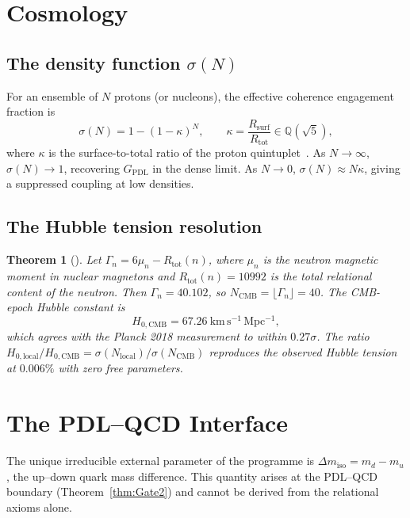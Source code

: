 \documentclass[11pt,a4paper]{article}
\theoremstyle{plain}
\newtheorem{theorem}{Theorem}[section]
\theoremstyle{definition}
\theoremstyle{remark}
\newcommand{\GPDL}{G_{\mathrm{PDL}}}
\newcommand{\Rsurf}{R_{\mathrm{surf}}}
\newcommand{\Rtot}{R_{\mathrm{tot}}}
\begin{document}
\section{Cosmology}
\label{sec:cosmology}

\subsection{The density function \texorpdfstring{$\sigma(N)$}{sigma(N)}}
\label{subsec:sigma}

For an ensemble of $N$ protons (or nucleons), the effective coherence engagement fraction is
\[
\sigma(N) = 1 - (1-\kappa)^N, \qquad \kappa = \frac{\Rsurf}{\Rtot} \in \mathbb{Q}(\sqrt{5}),
\]
where $\kappa$ is the surface-to-total ratio of the proton quintuplet~\citep{D24,D26}.
As $N\to\infty$, $\sigma(N)\to 1$, recovering $\GPDL$ in the dense limit.
As $N\to 0$, $\sigma(N)\approx N\kappa$, giving a suppressed coupling at low densities.

\subsection{The Hubble tension resolution}
\label{subsec:hubble}

\begin{theorem}[\citep{D27,D35}]
\label{thm:hubble}
Let $\Gamma_n = 6\mu_n - \Rtot(n)$, where $\mu_n$ is the neutron magnetic moment in nuclear magnetons and $\Rtot(n)=10992$ is the total relational content of the neutron.
Then $\Gamma_n = 40.102$, so $N_{\mathrm{CMB}} = \lfloor\Gamma_n\rfloor = 40$.
The CMB-epoch Hubble constant is
\[
H_{0,\mathrm{CMB}} = 67.26~\mathrm{km\,s^{-1}\,Mpc^{-1}},
\]
which agrees with the Planck 2018 measurement to within $0.27\sigma$.
The ratio $H_{0,\mathrm{local}}/H_{0,\mathrm{CMB}} = \sigma(N_{\mathrm{local}})/\sigma(N_{\mathrm{CMB}})$ reproduces the observed Hubble tension at $0.006\%$ with zero free parameters.
\end{theorem}

\section{The PDL--QCD Interface}
\label{sec:QCD}

The unique irreducible external parameter of the programme is $\Delta m_{\mathrm{iso}} = m_d - m_u$, the up--down quark mass difference.
This quantity arises at the PDL--QCD boundary (Theorem~\ref{thm:Gate2}) and cannot be derived from the relational axioms alone.
\end{document}
